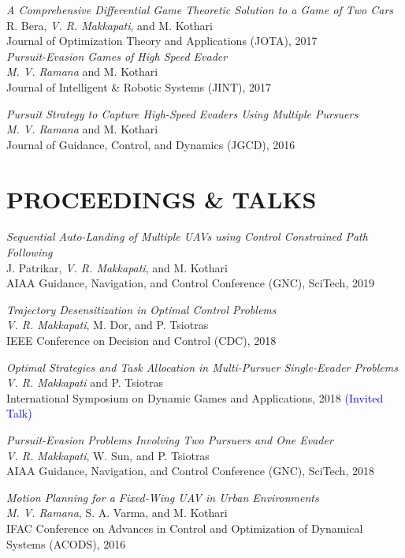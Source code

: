 \documentclass[margin, 10pt]{res} %
\newcommand{\ak}[1]{\textcolor{blue}{#1}}
\begin{document}
\begin{resume}
{\sl A Comprehensive Differential Game Theoretic Solution to a Game of Two Cars} \\ 
R. Bera, \textit{V. R. Makkapati}, and M. Kothari \\
Journal of Optimization Theory and Applications (JOTA), 2017 \\

{\sl Pursuit-Evasion Games of High Speed Evader} \\ 
\textit{M. V. Ramana} and M. Kothari \\
Journal of Intelligent \& Robotic Systems (JINT), 2017

{\sl Pursuit Strategy to Capture High-Speed Evaders Using Multiple Pursuers} \\
\textit{M. V. Ramana} and M. Kothari \\
Journal of Guidance, Control, and Dynamics (JGCD), 2016

\section{PROCEEDINGS \& TALKS}

{\sl Sequential Auto-Landing of Multiple UAVs using Control Constrained Path Following} \\
J. Patrikar, \textit{V. R. Makkapati}, and M. Kothari \\
AIAA Guidance, Navigation, and Control Conference (GNC), SciTech, 2019 

{\sl Trajectory Desensitization in Optimal Control Problems} \\
\textit{V. R. Makkapati}, M. Dor, and P. Tsiotras \\
IEEE Conference on Decision and Control (CDC), 2018 

{\sl Optimal Strategies and Task Allocation in Multi-Pursuer Single-Evader Problems}\\
\textit{V. R. Makkapati} and P. Tsiotras \\
International Symposium on Dynamic Games and Applications, 2018 \ak{(Invited Talk)}

{\sl Pursuit-Evasion Problems Involving Two Pursuers and One Evader} \\ 
\textit{V. R. Makkapati}, W. Sun, and P. Tsiotras \\
AIAA Guidance, Navigation, and Control Conference (GNC), SciTech, 2018

{\sl Motion Planning for a Fixed-Wing UAV in Urban Environments} \\
\textit{M. V. Ramana}, S. A. Varma, and M. Kothari \\
IFAC Conference on Advances in Control and Optimization of Dynamical Systems (ACODS), 2016


\end{resume}
\end{document}
